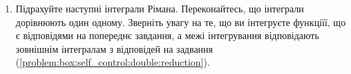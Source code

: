 \begin{enumerate}
\begin{enumerate}[label*=\arabic*.]
\end{enumerate}
\item\label{problem:box:self_control:double:outer} Підрахуйте наступні інтеграли Рімана. Переконайтесь, що інтеграли дорівнюють один одному. Зверніть увагу на те, що ви інтегруєте функціїї, що є відповідями на попереднє завдання, а межі інтегрування відповідають зовнішнім інтегралам з відповідей на задвання (\ref{problem:box:self_control:double:reduction}).
\par\noindent
\begin{minipage}{14.5cm}
\begin{enumerate}[label*=\arabic*.]

\end{enumerate}
\end{minipage}
\end{enumerate}
